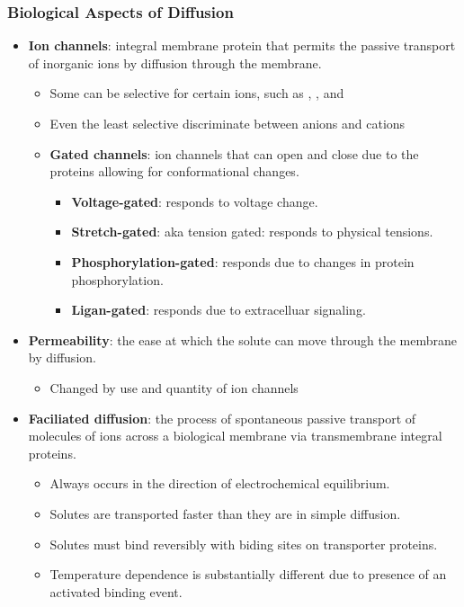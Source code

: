 \documentclass[12pt,a4paper]{article}
\begin{document}
    \subsubsection{Biological Aspects of Diffusion}
    \begin{itemize}
        \item \textbf{Ion channels}: integral membrane protein that permits the passive transport of inorganic ions by diffusion through the membrane.
            \begin{itemize}
                \item Some can be selective for certain ions, such as {\color{pos}}, {\color{neg}}, and {\color{pos}}
                \item Even the least selective discriminate between {\color{neg}anions} and {\color{pos}cations}
                \item \textbf{Gated channels}: ion channels that can open and close due to the proteins allowing for conformational changes.
                    \begin{itemize}
                        \item \textbf{Voltage-gated}: responds to voltage change.
                        \item \textbf{Stretch-gated}: aka tension gated: responds to physical tensions.
                        \item \textbf{Phosphorylation-gated}: responds due to changes in protein phosphorylation.
                        \item \textbf{Ligan-gated}: responds due to extracelluar signaling.
                    \end{itemize}
            \end{itemize}
        \item \textbf{Permeability}: the ease at which the solute can move through the membrane by diffusion.
            \begin{itemize}
                \item Changed by use and quantity of ion channels 
            \end{itemize}
        \item \textbf{Faciliated diffusion}: the process of spontaneous passive transport of molecules of ions across a biological membrane via transmembrane integral proteins.
        \begin{itemize}
            \item Always occurs in the direction of electrochemical equilibrium.
            \item Solutes are transported faster than they are in simple diffusion.
            \item Solutes must bind reversibly with biding sites on transporter proteins.
            \item Temperature dependence is substantially different due to presence of an activated binding event.
        \end{itemize}
\end{itemize}
\end{document}
